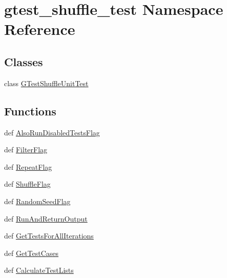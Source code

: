 \hypertarget{namespacegtest__shuffle__test}{\section{gtest\-\_\-shuffle\-\_\-test \-Namespace \-Reference}
\label{d3/d15/namespacegtest__shuffle__test}
}
\subsection*{\-Classes}
\begin{DoxyCompactItemize}
\item 
class \hyperlink{classgtest__shuffle__test_1_1GTestShuffleUnitTest}{\-G\-Test\-Shuffle\-Unit\-Test}
\end{DoxyCompactItemize}
\subsection*{\-Functions}
\begin{DoxyCompactItemize}
\item 
def \hyperlink{namespacegtest__shuffle__test_aa17301025facdaa1591c5a5d5410f837}{\-Also\-Run\-Disabled\-Tests\-Flag}
\item 
def \hyperlink{namespacegtest__shuffle__test_a4a93f7e13b5e23134c98eefcda7f5d5f}{\-Filter\-Flag}
\item 
def \hyperlink{namespacegtest__shuffle__test_a25f08fd6d8005f63e1c7a609756c624d}{\-Repeat\-Flag}
\item 
def \hyperlink{namespacegtest__shuffle__test_a45914cdb76091c46cd46a7f2fcaf7590}{\-Shuffle\-Flag}
\item 
def \hyperlink{namespacegtest__shuffle__test_aa0657c364fd687636675fba51c7b94c5}{\-Random\-Seed\-Flag}
\item 
def \hyperlink{namespacegtest__shuffle__test_a13d2ad435ca073d858111fd77ae578e4}{\-Run\-And\-Return\-Output}
\item 
def \hyperlink{namespacegtest__shuffle__test_a39d093b6415900460c3e11f5db85ad5a}{\-Get\-Tests\-For\-All\-Iterations}
\item 
def \hyperlink{namespacegtest__shuffle__test_ac74f1a346d22dbe51d4a4fa3b3b6ae1b}{\-Get\-Test\-Cases}
\item 
def \hyperlink{namespacegtest__shuffle__test_a52bc4812a258c3d1606540722e76c44a}{\-Calculate\-Test\-Lists}
\end{DoxyCompactItemize}

